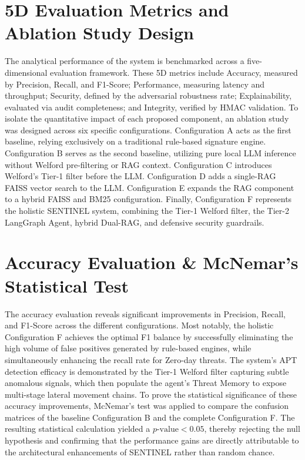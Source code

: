 \section{5D Evaluation Metrics and Ablation Study Design}
The analytical performance of the system is benchmarked across a five-dimensional evaluation framework. These 5D metrics include Accuracy, measured by Precision, Recall, and F1-Score; Performance, measuring latency and throughput; Security, defined by the adversarial robustness rate; Explainability, evaluated via audit completeness; and Integrity, verified by HMAC validation. To isolate the quantitative impact of each proposed component, an ablation study was designed across six specific configurations. Configuration A acts as the first baseline, relying exclusively on a traditional rule-based signature engine. Configuration B serves as the second baseline, utilizing pure local LLM inference without Welford pre-filtering or RAG context. Configuration C introduces Welford's Tier-1 filter before the LLM. Configuration D adds a single-RAG FAISS vector search to the LLM. Configuration E expands the RAG component to a hybrid FAISS and BM25 configuration. Finally, Configuration F represents the holistic SENTINEL system, combining the Tier-1 Welford filter, the Tier-2 LangGraph Agent, hybrid Dual-RAG, and defensive security guardrails.

\section{Accuracy Evaluation \& McNemar's Statistical Test}
The accuracy evaluation reveals significant improvements in Precision, Recall, and F1-Score across the different configurations. Most notably, the holistic Configuration F achieves the optimal F1 balance by successfully eliminating the high volume of false positives generated by rule-based engines, while simultaneously enhancing the recall rate for Zero-day threats. The system's APT detection efficacy is demonstrated by the Tier-1 Welford filter capturing subtle anomalous signals, which then populate the agent's Threat Memory to expose multi-stage lateral movement chains. To prove the statistical significance of these accuracy improvements, McNemar's test was applied to compare the confusion matrices of the baseline Configuration B and the complete Configuration F. The resulting statistical calculation yielded a $p\text{-value} < 0.05$, thereby rejecting the null hypothesis and confirming that the performance gains are directly attributable to the architectural enhancements of SENTINEL rather than random chance.

